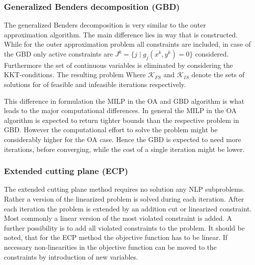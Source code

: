         \subsubsection{Generalized Benders decomposition (GBD)}
        The generalized Benders decomposition is very similar to the outer approximation algorithm. The main difference
        lies in way that  is constructed. While for the outer approximation problem all constraints
        are included, in case of the GBD only active constraints are $J^k = \{j \; | \; g_j(x^k,y^k) = 0\}$ considered.
        Furthermore the set of continuous variables is eliminated by considering the KKT-conditions. The resulting problem
        Where $\mathcal{K}_{FS}$ and $\mathcal{K}_{IS}$ denote the sets of solutions for of feasible and infeasible
        iterations respectively.

        This difference in formulation the MILP in the OA and GBD algorithm is what leads to the major computational differences. 
        In general the MILP in the OA algorithm is expected to return tighter bounds than the respective
        problem in GBD. However the computational effort to solve the problem might be considerably higher for the
        OA case. Hence the GBD is expected to need more iterations, before converging, while the cost of a single
        iteration might be lower.

        \subsubsection{Extended cutting plane (ECP)}
        The extended cutting plane method requires no solution any NLP subproblems. Rather a version of the linearized
        problem is solved during each iteration. After each iteration the problem is extended by an addition cut or
        linearized constraint. Most commonly a linear version of the most violated constraint is added. A further
        possibility is to add all violated constraints to the problem. It should be noted, that for the ECP method
        the objective function has to be linear. If necessary non-linearities in the objective function can be moved to the 
        constraints by introduction of new variables.

